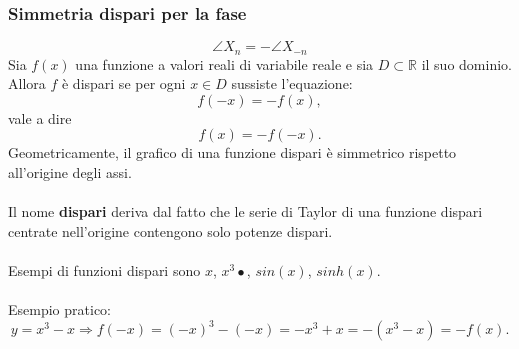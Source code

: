 \documentclass[12pt,oneside,openany]{memoir}
\numberwithin{equation}{subsection}
\begin{document}

\subsubsection{Simmetria dispari per la fase}
\begin{equation}
	\angle X_n = - \angle X_{-n}
\end{equation}
Sia $f(x)$ una funzione a valori reali di variabile reale e sia $D \subset
\mathbb{R}$ il suo dominio. Allora $f$ \`e dispari se per ogni $x \in D$
sussiste l'equazione:
\[
	f(-x) = - f(x),
\]
vale a dire
\[
	f(x) = - f(-x).
\]
Geometricamente, il grafico di una funzione dispari \`e simmetrico rispetto
all'origine degli assi.\\
\\
Il nome \textbf{dispari} deriva dal fatto che le serie di Taylor di una funzione
dispari centrate nell'origine contengono solo potenze dispari.\\
\\
Esempi di funzioni dispari sono $x$, $x^3•$, $sin(x)$, $sinh(x)$.\\
\\
Esempio pratico:
\[
	y = x^3 - x \Longrightarrow f(-x) = (-x)^3 - (-x) = -x^3 + x =
	-(x^3 - x) = -f(x).
\]


\newpage
\end{document}
